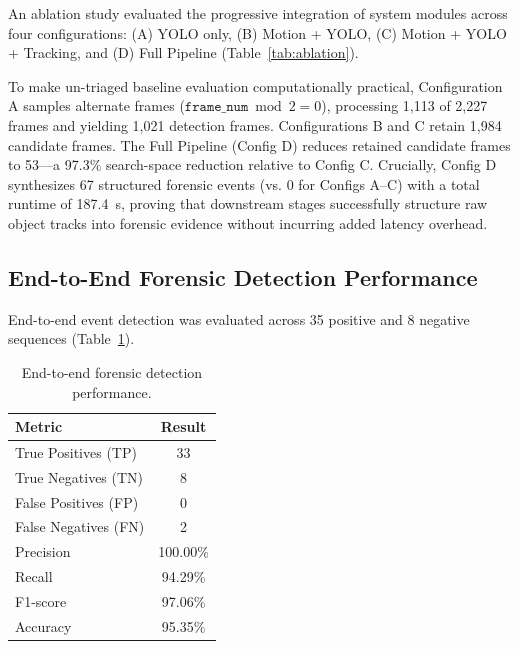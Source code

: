\documentclass[runningheads]{llncs}
\begin{document}
An ablation study evaluated the progressive integration of system modules across four configurations: (A) YOLO only, (B) Motion + YOLO, (C) Motion + YOLO + Tracking, and (D) Full Pipeline (Table~\ref{tab:ablation}).

\begin{table}[t]
\centering
\caption{Ablation study of the proposed pipeline architecture.}
\label{tab:ablation}
\end{table}

To make un-triaged baseline evaluation computationally practical, Configuration A samples alternate frames ($\texttt{frame\_num}\bmod 2=0$), processing 1,113 of 2,227 frames and yielding 1,021 detection frames. Configurations B and C retain 1,984 candidate frames. The Full Pipeline (Config D) reduces retained candidate frames to 53---a 97.3\% search-space reduction relative to Config C. Crucially, Config D synthesizes 67 structured forensic events (vs. 0 for Configs A--C) with a total runtime of 187.4~s, proving that downstream stages successfully structure raw object tracks into forensic evidence without incurring added latency overhead.

\subsection{End-to-End Forensic Detection Performance}

End-to-end event detection was evaluated across 35 positive and 8 negative sequences (Table~\ref{tab:end_to_end_performance}).

\begin{table}[htbp]
\centering
\caption{End-to-end forensic detection performance.}
\label{tab:end_to_end_performance}
\scriptsize
\renewcommand{\arraystretch}{0.75}
\begin{tabular}{lc}
\hline
\textbf{Metric} & \textbf{Result} \\
\hline
True Positives (TP) & 33 \\
True Negatives (TN) & 8 \\
False Positives (FP) & 0 \\
False Negatives (FN) & 2 \\
Precision & 100.00\% \\
Recall & 94.29\% \\
F1-score & 97.06\% \\
Accuracy & 95.35\% \\
\hline
\end{tabular}
\end{table}
\end{document}
